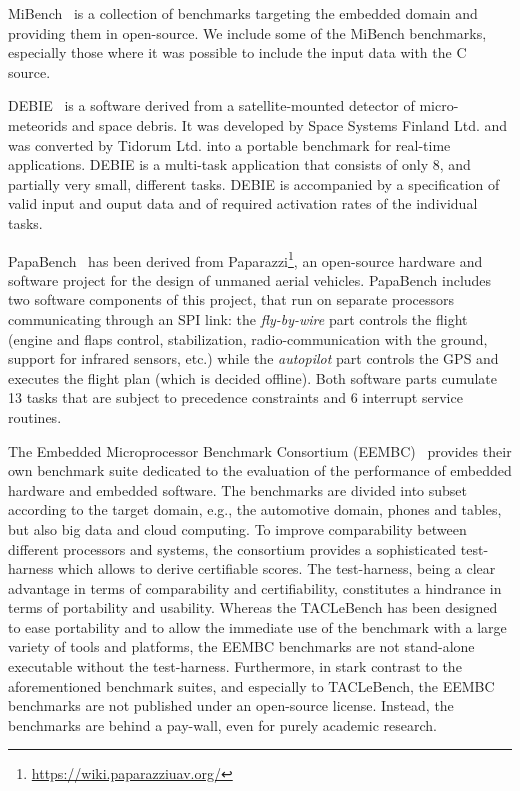 \documentclass[a4paper,UKenglish]{oasics}
\begin{document}
MiBench~\cite{MiBench} is a collection of benchmarks targeting the embedded
domain and providing them in open-source.
We include some of the MiBench benchmarks, especially
those where it was possible to include the input data with the C source.

DEBIE~\cite{debie} is a software derived from a satellite-mounted detector of micro-meteorids and space debris.
It was developed by Space Systems Finland Ltd. and was converted by Tidorum Ltd. into a portable benchmark for real-time applications.
DEBIE is a multi-task application that consists of only 8, and partially very small, different tasks.
DEBIE is accompanied by a specification of valid input and ouput data and of required activation rates of the individual tasks.

PapaBench~\cite{papabench} has been derived from  Paparazzi\footnote{\url{https://wiki.paparazziuav.org/}},
an open-source hardware and software project for the design of unmaned aerial vehicles.  PapaBench includes
two software components of this project, that run on separate processors communicating through an SPI link:
the \textit{fly-by-wire} part controls the flight (engine and flaps control, stabilization, radio-communication
with the ground, support for infrared sensors, etc.) while the \textit{autopilot} part controls the GPS and
executes the flight plan (which is decided offline). Both software parts  cumulate 13 tasks that are subject
to precedence constraints and 6 interrupt service routines.

The Embedded Microprocessor Benchmark Consortium (EEMBC)~\cite{eembc} provides their own benchmark suite dedicated to the evaluation of
the performance of embedded hardware and embedded software.
The benchmarks are divided into subset according to the target domain, e.g., the automotive domain, phones and tables, but also big data and cloud computing.
To improve comparability between different processors and systems, the consortium provides a sophisticated test-harness which allows to derive certifiable scores.
The test-harness, being a clear advantage in terms of comparability and certifiability, constitutes a hindrance in terms of portability and usability.
Whereas the TACLeBench has been designed to ease portability and to allow the immediate use of the benchmark with a large variety of tools and platforms, the EEMBC benchmarks are not stand-alone executable without the test-harness.
Furthermore, in stark contrast to the aforementioned benchmark suites, and especially to TACLeBench, the EEMBC benchmarks are not published under an open-source license.
Instead, the benchmarks are behind a pay-wall, even for purely academic research.
\end{document}
